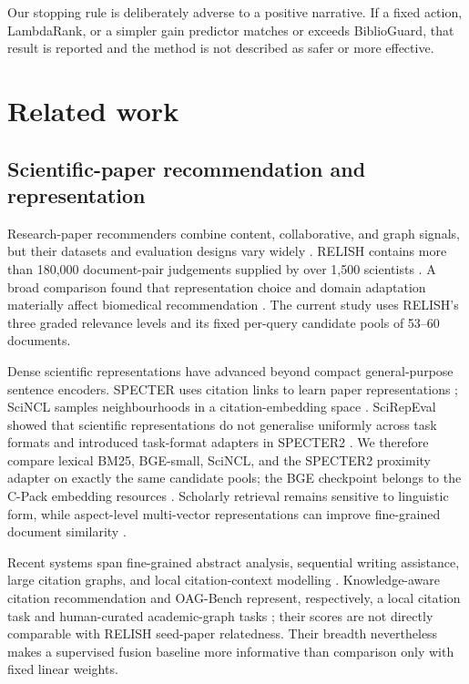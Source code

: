 \documentclass[11pt]{article}
\begin{document}
Our stopping rule is deliberately adverse to a positive narrative.  If a fixed action,
LambdaRank, or a simpler gain predictor matches or exceeds BiblioGuard, that result is
reported and the method is not described as safer or more effective.

\section{Related work}

\subsection{Scientific-paper recommendation and representation}

Research-paper recommenders combine content, collaborative, and graph signals, but
their datasets and evaluation designs vary widely \citep{zhang2023survey}.  RELISH
contains more than 180,000 document-pair judgements supplied by over 1,500 scientists
\citep{brown2019relish}.  A broad comparison found that representation choice and
domain adaptation materially affect biomedical recommendation
\citep{zhang2022comparative}.  The current study uses RELISH's three graded relevance
levels and its fixed per-query candidate pools of 53--60 documents.

Dense scientific representations have advanced beyond compact general-purpose
sentence encoders.  SPECTER uses citation links to learn paper representations
\citep{cohan2020specter}; SciNCL samples neighbourhoods in a citation-embedding space
\citep{ostendorff2022scincl}.  SciRepEval showed that scientific representations do not
generalise uniformly across task formats and introduced task-format adapters in
SPECTER2 \citep{singh2023scirepeval}.  We therefore compare lexical BM25, BGE-small,
SciNCL, and the SPECTER2 proximity adapter on exactly the same candidate pools; the
BGE checkpoint belongs to the C-Pack embedding resources \citep{xiao2024cpack}.
Scholarly retrieval remains sensitive to linguistic form, while aspect-level
multi-vector representations can improve fine-grained document similarity
\citep{singh2022inefficiency,mysore2022multivector}.

Recent systems span fine-grained abstract analysis, sequential writing assistance,
large citation graphs, and local citation-context modelling
\citep{takahashi2022solutiontailor,santosa2024s3par,stergiopoulos2024academic,
kanwal2024multiple,jebari2023context,goyal2024symtax}.  Knowledge-aware citation
recommendation and OAG-Bench represent, respectively, a local citation task and
human-curated academic-graph tasks \citep{wu2024supporting,zhang2024oagbench}; their
scores are not directly comparable with RELISH seed-paper relatedness.  Their breadth
nevertheless makes a supervised fusion baseline more informative than comparison only
with fixed linear weights.
\end{document}
